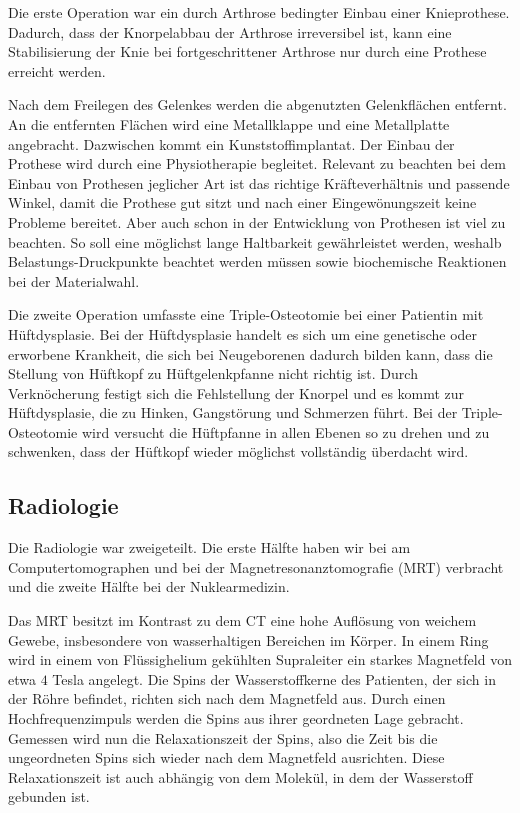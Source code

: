\documentclass[11pt,a4paper,titlepage]{scrartcl}
\begin{document}
Die erste Operation war ein durch Arthrose bedingter Einbau einer Knieprothese.
Dadurch, dass der Knorpelabbau der Arthrose irreversibel ist, kann eine Stabilisierung der Knie bei fortgeschrittener Arthrose nur durch eine Prothese erreicht werden.\medskip

Nach dem Freilegen des Gelenkes werden die abgenutzten Gelenkflächen entfernt.
An die entfernten Flächen wird eine Metallklappe und eine Metallplatte angebracht.
Dazwischen kommt ein Kunststoffimplantat.
Der Einbau der Prothese wird durch eine Physiotherapie begleitet.
Relevant zu beachten bei dem Einbau von Prothesen jeglicher Art ist das richtige Kräfteverhältnis und passende Winkel, damit die Prothese gut sitzt und nach einer Eingewönungszeit keine Probleme bereitet.
Aber auch schon in der Entwicklung von Prothesen ist viel zu beachten.
So soll eine möglichst lange Haltbarkeit gewährleistet werden, weshalb Belastungs-Druckpunkte beachtet werden müssen sowie biochemische Reaktionen bei der Materialwahl.\medskip

Die zweite Operation umfasste eine Triple-Osteotomie bei einer Patientin mit Hüftdysplasie.
Bei der Hüftdysplasie handelt es sich um eine genetische oder erworbene Krankheit, die sich bei Neugeborenen dadurch bilden kann, dass die Stellung von Hüftkopf zu Hüftgelenkpfanne nicht richtig ist.
Durch Verknöcherung festigt sich die Fehlstellung der Knorpel und es kommt zur Hüftdysplasie, die zu Hinken, Gangstörung und Schmerzen führt.
Bei der Triple-Osteotomie wird versucht die Hüftpfanne in allen Ebenen so zu drehen und zu schwenken, dass der Hüftkopf wieder möglichst vollständig überdacht wird. \medskip





\subsection{Radiologie}

Die Radiologie war zweigeteilt.
Die erste Hälfte haben wir bei am Computertomographen und bei der Magnetresonanztomografie (MRT) verbracht und die zweite Hälfte bei der Nuklearmedizin. \medskip

Das MRT besitzt im Kontrast zu dem CT eine hohe Auflösung von weichem Gewebe, insbesondere von wasserhaltigen Bereichen im Körper.
In einem Ring wird in einem von Flüssighelium gekühlten Supraleiter ein starkes Magnetfeld von etwa $4$ Tesla angelegt.
Die Spins der Wasserstoffkerne des Patienten, der sich in der Röhre befindet, richten sich nach dem Magnetfeld aus.
Durch einen Hochfrequenzimpuls werden die Spins aus ihrer geordneten Lage gebracht.
Gemessen wird nun die Relaxationszeit der Spins, also die Zeit bis die ungeordneten Spins sich wieder nach dem Magnetfeld ausrichten.
Diese Relaxationszeit ist auch abhängig von dem Molekül, in dem der Wasserstoff gebunden ist. \medskip
\end{document}
